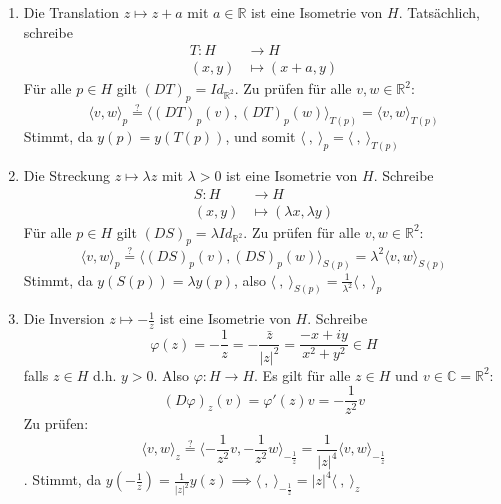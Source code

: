 \documentclass[../main.tex]{subfiles}
\begin{document}
\begin{remarks}
    \leavevmode
    \begin{enumerate}
        \item Die Translation $z \mapsto z + a$ mit $a \in \mathbb{R}$ ist eine Isometrie von $H$.
        Tatsächlich, schreibe
        \begin{align*}
            T : H & \to H \\ (x,y) & \mapsto (x+a,y)
        \end{align*}
        Für alle $p \in H$ gilt $(DT)_p = Id_{\mathbb{R}^2}$. Zu prüfen für alle $v,w \in \mathbb{R}^2$:
        $$\langle v,w \rangle _p \overset{?}{=} \langle (DT)_p(v),(DT)_p(w) \rangle _{T(p)} = \langle v,w \rangle _{T(p)}$$
        Stimmt, da $y(p)=y(T(p))$, und somit $\langle \ , \ \rangle _p = \langle \ , \ \rangle _{T(p)}$

        \item Die Streckung $z \mapsto \lambda z$ mit $\lambda >0$ ist eine Isometrie von $H$.
        Schreibe
        \begin{align*}
            S : H & \to H \\ (x,y) & \mapsto (\lambda x, \lambda y)
        \end{align*}
        Für alle $p \in H$ gilt $(DS)_p = \lambda Id_{\mathbb{R}^2}$. Zu prüfen für alle $v,w \in \mathbb{R}^2$:
        $$\langle v,w \rangle _p \overset{?}{=} \langle (DS)_p(v),(DS)_p(w) \rangle _{S(p)} = \lambda ^2 \langle v,w \rangle _{S(p)}$$
        Stimmt, da $y(S(p)) = \lambda y(p)$, also $\langle \ , \ \rangle _{S(p)} = \frac{1}{\lambda ^2} \langle \ ,\ \rangle _p$

        \item Die Inversion $z \mapsto -\frac{1}{z}$ ist eine Isometrie von $H$.
        Schreibe $$\varphi (z) = -\frac{1}{z} = - \frac{\bar{z}}{|z|^2}=\frac{-x+iy}{x^2+y^2} \in H$$ falls $z\in H$ d.h. $y>0$.
        Also $\varphi : H \to H$. Es gilt für alle $z \in H$ und $v \in \mathbb{C} = \mathbb{R}^2$:
        $$(D\varphi )_z (v)=\varphi ' (z) v = -\frac{1}{z^2}v$$
        Zu prüfen: $$\langle v, w \rangle _z \overset{?}{=} \langle -\frac{1}{z^2}v,-\frac{1}{z^2}w \rangle _{-\frac{1}{z}} = \frac{1}{|z|^4}\langle v,w\rangle _{-\frac{1}{z}}$$.
        Stimmt, da $y(-\frac{1}{z}) = \frac{1}{|z|^2} y(z) \implies \langle \ , \ \rangle _{-\frac{1}{z}} = |z|^4 \langle \ , \ \rangle _{z}$ 

    \end{enumerate}
\end{remarks}
\end{document}
